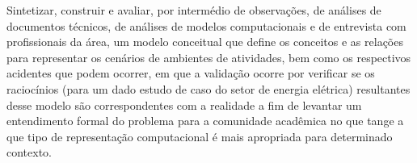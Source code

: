Sintetizar, construir e avaliar, por intermédio de observações, de análises de documentos técnicos, de análises de modelos computacionais e de entrevista com profissionais da área, um modelo conceitual que define os conceitos e as relações para representar os cenários de ambientes de atividades, bem como os respectivos acidentes que podem ocorrer, em que a validação ocorre por verificar se os raciocínios (para um dado estudo de caso do setor de energia elétrica) resultantes desse modelo são correspondentes com a realidade a fim de levantar um entendimento formal do problema para a comunidade acadêmica no que tange a que tipo de representação computacional é mais apropriada para determinado contexto. 